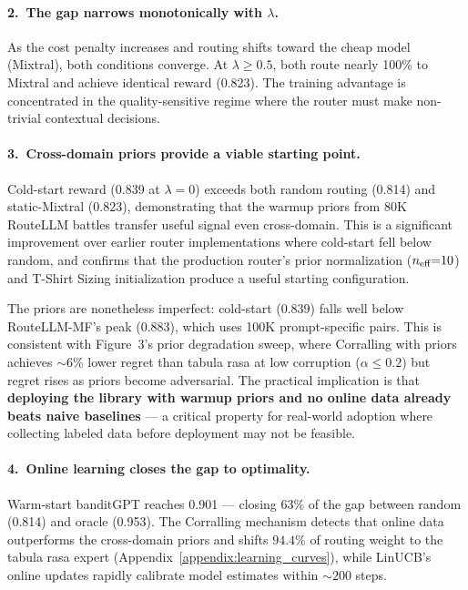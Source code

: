 \paragraph{2.\ The gap narrows monotonically with $\lambda$.}
As the cost penalty increases and routing shifts toward the cheap model
(Mixtral), both conditions converge.  At $\lambda \geq 0.5$, both
route nearly 100\% to Mixtral and achieve identical reward (0.823).  The
training advantage is concentrated in the quality-sensitive regime where the
router must make non-trivial contextual decisions.

\paragraph{3.\ Cross-domain priors provide a viable starting point.}
Cold-start reward (0.839 at $\lambda{=}0$) exceeds both random routing
(0.814) and static-Mixtral (0.823), demonstrating that the warmup priors
from 80K RouteLLM battles transfer useful signal even cross-domain.  This
is a significant improvement over earlier router implementations where
cold-start fell below random, and confirms that the production router's
prior normalization ($n_{\text{eff}}{=}10$) and T-Shirt Sizing initialization
produce a useful starting configuration.

The priors are nonetheless imperfect: cold-start (0.839) falls well below
RouteLLM-MF's peak (0.883), which uses 100K prompt-specific pairs.
This is consistent with Figure~3's prior degradation sweep, where
Corralling with priors achieves ${\sim}$6\% lower regret than tabula rasa
at low corruption ($\alpha \leq 0.2$) but regret rises as priors become adversarial.
The practical implication is that \textbf{deploying the library with
warmup priors and no online data already beats naive baselines} ---
a critical property for real-world adoption where collecting labeled
data before deployment may not be feasible.

\paragraph{4.\ Online learning closes the gap to optimality.}
Warm-start banditGPT reaches 0.901 --- closing 63\% of the gap between
random (0.814) and oracle (0.953).  The Corralling mechanism detects that
online data outperforms the cross-domain priors and shifts $94.4\%$ of
routing weight to the tabula rasa expert
(Appendix~\ref{appendix:learning_curves}), while LinUCB's online updates
rapidly calibrate model estimates within ${\sim}200$ steps.

